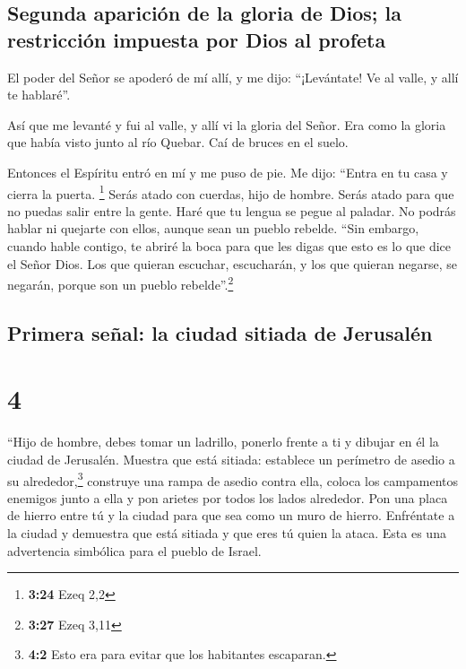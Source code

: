 \hypertarget{segunda-apariciuxf3n-de-la-gloria-de-dios-la-restricciuxf3n-impuesta-por-dios-al-profeta}{%
\subsection{Segunda aparición de la gloria de Dios; la restricción
impuesta por Dios al
profeta}\label{segunda-apariciuxf3n-de-la-gloria-de-dios-la-restricciuxf3n-impuesta-por-dios-al-profeta}}

 El poder del Señor se apoderó de mí allí, y me dijo:
``¡Levántate! Ve al valle, y allí te hablaré''.

 Así que me levanté y fui al valle, y allí vi la gloria
del Señor. Era como la gloria que había visto junto al río Quebar. Caí
de bruces en el suelo.

 Entonces el Espíritu entró en mí y me puso de pie. Me
dijo: ``Entra en tu casa y cierra la puerta. \footnote{\textbf{3:24}
  Ezeq 2,2}  Serás atado con cuerdas, hijo de hombre.
Serás atado para que no puedas salir entre la gente. 
Haré que tu lengua se pegue al paladar. No podrás hablar ni quejarte con
ellos, aunque sean un pueblo rebelde.  ``Sin embargo,
cuando hable contigo, te abriré la boca para que les digas que esto es
lo que dice el Señor Dios. Los que quieran escuchar, escucharán, y los
que quieran negarse, se negarán, porque son un pueblo
rebelde''.\footnote{\textbf{3:27} Ezeq 3,11}

\hypertarget{primera-seuxf1al-la-ciudad-sitiada-de-jerusaluxe9n}{%
\subsection{Primera señal: la ciudad sitiada de
Jerusalén}\label{primera-seuxf1al-la-ciudad-sitiada-de-jerusaluxe9n}}

\hypertarget{section-3}{%
\section{4}\label{section-3}}

 ``Hijo de hombre, debes tomar un ladrillo, ponerlo frente
a ti y dibujar en él la ciudad de Jerusalén.  Muestra que
está sitiada: establece un perímetro de asedio a su
alrededor,\footnote{\textbf{4:2} Esto era para evitar que los habitantes
  escaparan.} construye una rampa de asedio contra ella, coloca los
campamentos enemigos junto a ella y pon arietes por todos los lados
alrededor.  Pon una placa de hierro entre tú y la ciudad
para que sea como un muro de hierro. Enfréntate a la ciudad y demuestra
que está sitiada y que eres tú quien la ataca. Esta es una advertencia
simbólica para el pueblo de Israel.

